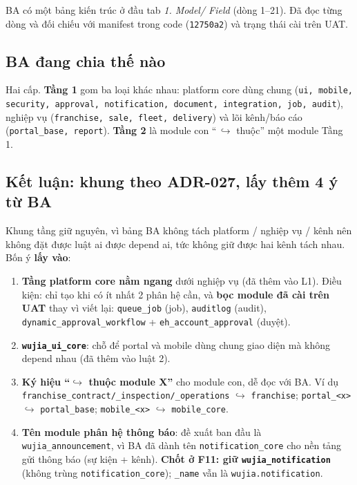 BA có một bảng kiến trúc ở đầu tab \emph{1. Model/ Field} (dòng 1--21). Đã đọc từng dòng và đối
chiếu với manifest trong code (\texttt{12750a2}) và trạng thái cài trên UAT.

\subsection*{BA đang chia thế nào}

Hai cấp. \textbf{Tầng 1} gom ba loại khác nhau: platform core dùng chung (\texttt{ui, mobile,
security, approval, notification, document, integration, job, audit}), nghiệp vụ
(\texttt{franchise, sale, fleet, delivery}) và lõi kênh/báo cáo (\texttt{portal\_base, report}).
\textbf{Tầng 2} là module con ``\,$\hookrightarrow$ thuộc'' một module Tầng 1.

\subsection*{Kết luận: khung theo ADR-027, lấy thêm 4 ý từ BA}

Khung tầng giữ nguyên, vì bảng BA không tách platform / nghiệp vụ / kênh nên không đặt được
luật ai được depend ai, tức không giữ được hai kênh tách nhau. Bốn ý \textbf{lấy vào}:

\begin{enumerate}
\item \textbf{Tầng platform core nằm ngang} dưới nghiệp vụ (đã thêm vào L1). Điều kiện: chỉ tạo khi
  có ít nhất 2 phân hệ cần, và \textbf{bọc module đã cài trên UAT} thay vì viết lại:
  \texttt{queue\_job} (job), \texttt{auditlog} (audit), \texttt{dynamic\_approval\_workflow} +
  \texttt{eh\_account\_approval} (duyệt).
\item \textbf{\texttt{wujia\_ui\_core}}: chỗ để portal và mobile dùng chung giao diện mà không depend
  nhau (đã thêm vào luật 2).
\item \textbf{Ký hiệu ``$\hookrightarrow$ thuộc module X''} cho module con, dễ đọc với BA. Ví dụ
  \texttt{franchise\_contract/\_inspection/\_operations} $\hookrightarrow$ \texttt{franchise};
  \texttt{portal\_<x>} $\hookrightarrow$ \texttt{portal\_base}; \texttt{mobile\_<x>}
  $\hookrightarrow$ \texttt{mobile\_core}.
\item \textbf{Tên module phân hệ thông báo}: đề xuất ban đầu là \texttt{wujia\_announcement}, vì BA đã
  dành tên \texttt{notification\_core} cho nền tảng gửi thông báo (sự kiện + kênh). \textbf{Chốt ở F11:
  giữ \texttt{wujia\_notification}} (không trùng \texttt{notification\_core}); \texttt{\_name} vẫn là
  \texttt{wujia.notification}.
\end{enumerate}

